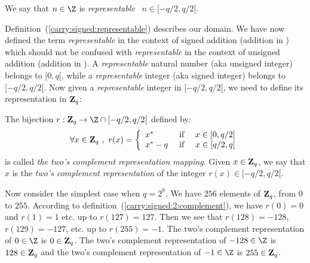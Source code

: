 \documentclass{article}
\newcommand{\zq}{\mbox{${\bf Z}_{q}$}}
\begin{document}
\begin{defin}\label{carry:signed:representable}
We say that $n\in\Z$ is {\em representable} \ifand\ $n\in[-q/2,q/2[$.
\end{defin}
 
Definition~(\ref{carry:signed:representable}) describes our domain. We
have now defined the term {\em representable} in the context of signed 
addition (addition in \Z) which should not be confused with 
{\em representable} in the context of unsigned addition (addition in \N).
A {\em representable} natural number (aka unsigned integer) belongs to 
$[0,q[$, while a {\em representable} integer (aka signed integer) belongs
to $[-q/2,q/2[$. Now given a {\em representable} integer in $[-q/2,q/2[$,
we need to define its representation in \zq:

\begin{defin}\label{carry:signed:2:complement}
The bijection $r:\zq\rightarrow\Z\cap[-q/2,q/2[$ defined by:
  \[
    \forall x\in\zq\ ,\ r(x)=
      \left\{
          \begin{array}{lcr}
          x^{*}&\mbox{\ if\ }&x\in[0,q/2[\\
          x^{*}-q&\mbox{\ if\ }&x\in[q/2,q[
        \end{array}
      \right.
  \]
is called {\em the two's complement representation mapping}. Given $x\in\zq$,
  we say that $x$ is the {\em two's complement representation} of the 
  integer $r(x)\in[-q/2,q/2[$.
\end{defin}

Now consider the simplest case when $q=2^8$. We have $256$ elements of \zq, 
from $0$ to $255$. According to definition~(\ref{carry:signed:2:complement}),
we have $r(0)=0$ and $r(1) = 1$ etc. up to $r(127)=127$. Then we see that 
$r(128)=-128$, $r(129)=-127$, etc. up to $r(255)=-1$. The two's complement
representation of $0\in\Z$ is $0\in\zq$. The two's complement representation
of $-128\in\Z$ is $128\in\zq$ and the two's complement representation of 
$-1\in\Z$ is $255\in\zq$.
\end{document}
